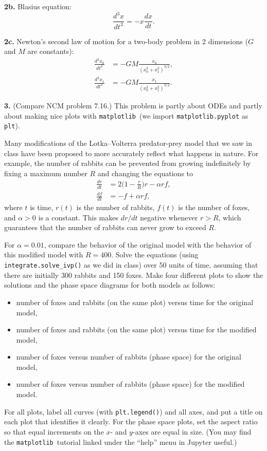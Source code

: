 \documentclass[11pt]{article}
\newcommand{\matplotlib}{{\tt matplotlib}}  %
\begin{document}
\par\bigskip
{\bf 2b.} Blasius equation:
$$ \frac{d^3 x}{dt^3} = -x\frac{dx}{dt}. $$

\par\bigskip
{\bf 2c.} Newton's second law of motion for a two-body problem in 2 dimensions 
($G$ and $M$ are constants):
\begin{align}
\frac{d^2 x_0}{dt^2} &= -GM\frac{x_0}{(x_0^2 + x_1^2)^{3/2}}, \\
\frac{d^2 x_1}{dt^2} &= -GM\frac{x_1}{(x_0^2 + x_1^2)^{3/2}}.
\end{align}

\par\bigskip
{\bf 3.} (Compare NCM problem 7.16.)
This problem is partly about ODEs and partly about making nice plots with
\matplotlib\ (we import {\tt matplotlib.pyplot} as {\tt plt}).

Many modifications of the Lotka--Volterra predator-prey model
that we saw in class have been proposed to
more accurately reflect what happens in nature.
For example, the number of rabbits can be prevented from growing
indefinitely by fixing a maximum number $R$ and changing the equations to
\begin{align}
\frac{dr}{dt} &= 2\Big(1-\frac{r}{R}\Big)r - \alpha rf, \\
\frac{df}{dt} &= -f + \alpha rf,
\end{align}
where $t$ is time, $r(t)$ is the number of rabbits, 
$f(t)$ is the number of foxes, and $\alpha>0$ is a constant.
This makes $dr/dt$ negative whenever $r > R$, 
which guarantees that the number of rabbits can never grow to exceed $R$.

For $\alpha = 0.01$, compare the behavior of the original model
with the behavior of this modified model with $R = 400$.
Solve the equations (using {\tt integrate.solve\_ivp()} as we did in class)
over 50 units of time, 
assuming that there are initially 300 rabbits and 150 foxes.
Make four different plots to show the solutions and the phase
space diagrams for both models as follows:
\begin{itemize}
\item number of foxes and rabbits (on the same plot) versus time for the original model,
\item number of foxes and rabbits (on the same plot) versus time for the modified model,
\item number of foxes versus number of rabbits (phase space) for the original model,
\item number of foxes versus number of rabbits (phase space) for the modified model.
\end{itemize}
For all plots, label all curves (with {\tt plt.legend()}) and all axes,
and put a title on each plot that identifies it clearly.
For the phase space plots, set the aspect
ratio so that equal increments on the $x$- and $y$-axes are equal in size.
(You may find the \matplotlib\ tutorial linked under the ``help'' menu
in Jupyter useful.)
\end{document}
